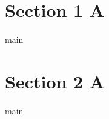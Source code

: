 \documentclass{article}
\begin{document}
    \section{Section 1 A}
    main
    \section{Section 2 A}
    main
\end{document}
